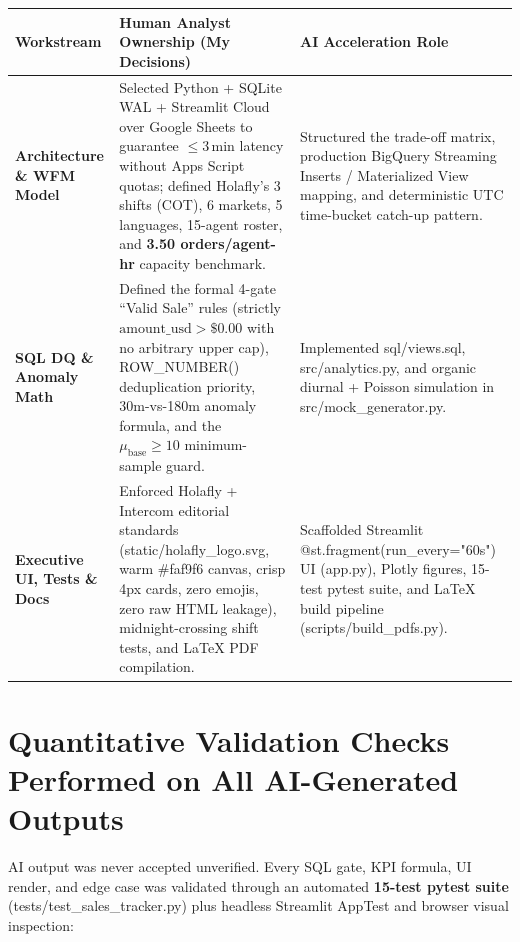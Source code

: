 \documentclass[10pt,letterpaper]{article}
\newcommand{\code}[1]{{\fontfamily{pcr}\selectfont\footnotesize\color{ink}#1}}
\begin{document}
\vspace{2pt}
\renewcommand{\arraystretch}{1.22}
\begin{tabularx}{\textwidth}{@{}>{\raggedright\arraybackslash}p{1.20in} >{\raggedright\arraybackslash}p{3.12in} >{\raggedright\arraybackslash}X@{}}
\toprule
\rowcolor{linen}
\textbf{\color{ink}Workstream} & \textbf{\color{ink}Human Analyst Ownership (My Decisions)} & \textbf{\color{ink}AI Acceleration Role} \\
\midrule
\textbf{\color{ink}Architecture \& WFM Model} &
Selected Python + SQLite WAL + Streamlit Cloud over Google Sheets to guarantee $\leq 3$\,min latency without Apps Script quotas; defined Holafly's 3 shifts (COT), 6 markets, 5 languages, 15-agent roster, and \textbf{3.50 orders/agent-hr} capacity benchmark. &
Structured the trade-off matrix, production BigQuery Streaming Inserts / Materialized View mapping, and deterministic UTC time-bucket catch-up pattern. \\
\rowcolor{cream}
\textbf{\color{ink}SQL DQ \& Anomaly Math} &
Defined the formal 4-gate ``Valid Sale'' rules (strictly $\text{amount\_usd} > \$0.00$ with no arbitrary upper cap), \code{ROW\_NUMBER()} deduplication priority, 30m-vs-180m anomaly formula, and the $\mu_{\text{base}} \geq 10$ minimum-sample guard. &
Implemented \code{sql/views.sql}, \code{src/analytics.py}, and organic diurnal + Poisson simulation in \code{src/mock\_generator.py}. \\
\textbf{\color{ink}Executive UI, Tests \& Docs} &
Enforced Holafly + Intercom editorial standards (\code{static/holafly\_logo.svg}, warm \code{\#faf9f6} canvas, crisp \code{4px} cards, zero emojis, zero raw HTML leakage), midnight-crossing shift tests, and LaTeX PDF compilation. &
Scaffolded Streamlit \code{@st.fragment(run\_every="60s")} UI (\code{app.py}), Plotly figures, 15-test \code{pytest} suite, and LaTeX build pipeline (\code{scripts/build\_pdfs.py}). \\
\bottomrule
\end{tabularx}

\section{Quantitative Validation Checks Performed on All AI-Generated Outputs}
AI output was never accepted unverified. Every SQL gate, KPI formula, UI render, and edge case was validated through an automated \textbf{15-test \code{pytest} suite} (\code{tests/test\_sales\_tracker.py}) plus headless Streamlit \code{AppTest} and browser visual inspection:
\end{document}
